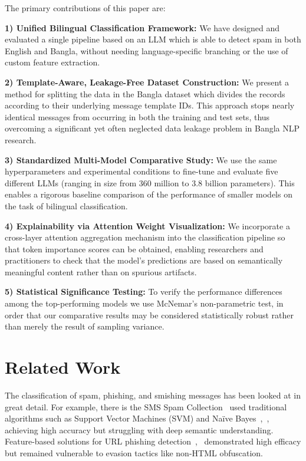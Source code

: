 \documentclass[journal]{IEEEtran}
\begin{document}
The primary contributions of this paper are:

\textbf{1) Unified Bilingual Classification Framework:} We have designed and evaluated a single pipeline based on an LLM which is able to detect spam in both English and Bangla, without needing language-specific branching or the use of custom feature extraction.

\textbf{2) Template-Aware, Leakage-Free Dataset Construction:} We present a method for splitting the data in the Bangla dataset which divides the records according to their underlying message template IDs. This approach stops nearly identical messages from occurring in both the training and test sets, thus overcoming a significant yet often neglected data leakage problem in Bangla NLP research.

\textbf{3) Standardized Multi-Model Comparative Study:} We use the same hyperparameters and experimental conditions to fine-tune and evaluate five different LLMs (ranging in size from 360 million to 3.8 billion parameters). This enables a rigorous baseline comparison of the performance of smaller models on the task of bilingual classification.

\textbf{4) Explainability via Attention Weight Visualization:} We incorporate a cross-layer attention aggregation mechanism into the classification pipeline so that token importance scores can be obtained, enabling researchers and practitioners to check that the model's predictions are based on semantically meaningful content rather than on spurious artifacts.

\textbf{5) Statistical Significance Testing:} To verify the performance differences among the top-performing models we use McNemar's non-parametric test, in order that our comparative results may be considered statistically robust rather than merely the result of sampling variance.



\section{Related Work}

The classification of spam, phishing, and smishing messages has been looked at in great detail. For example, there is the SMS Spam Collection~\cite{ref1} used traditional algorithms such as Support Vector Machines (SVM) and Naïve Bayes~\cite{ref1},~\cite{ref5}, achieving high accuracy but struggling with deep semantic understanding. Feature-based solutions for URL phishing detection~\cite{ref2},~\cite{ref8} demonstrated high efficacy but remained vulnerable to evasion tactics like non-HTML obfuscation.
\end{document}
